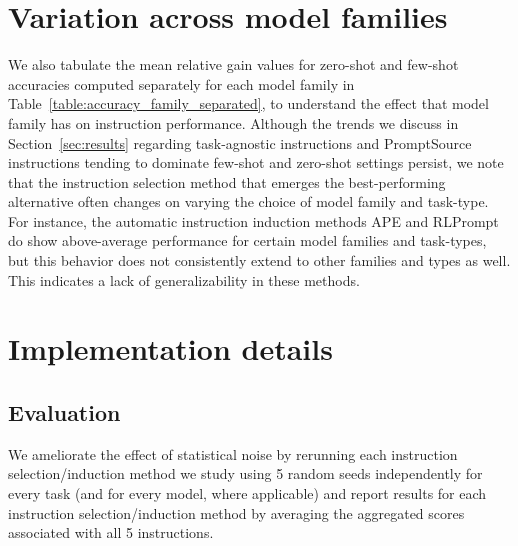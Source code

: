 \appendix

\section{Variation across model families}




We also tabulate the mean relative gain values for zero-shot and few-shot accuracies computed separately for each model family in Table~\ref{table:accuracy_family_separated}, to understand the effect that model family has on instruction performance. Although the trends we discuss in Section~\ref{sec:results} regarding task-agnostic instructions and PromptSource instructions tending to dominate few-shot and zero-shot settings persist, we note that the instruction selection method that emerges the best-performing alternative often changes on varying the choice of model family and task-type. For instance, the automatic instruction induction methods APE and RLPrompt do show above-average performance for certain model families and task-types, but this behavior does not consistently extend to other families and types as well. This indicates a lack of generalizability in these methods.

\section{Implementation details}
\subsection{Evaluation}


We ameliorate the effect of statistical noise by rerunning each instruction selection/induction method we study using 5 random seeds independently for every task (and for every model, where applicable) and report results for each instruction selection/induction method by averaging the aggregated scores associated with all 5 instructions. 

